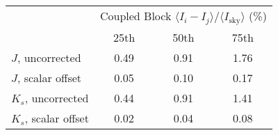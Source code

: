 \begin{tabular}{lccc}
& \multicolumn{3}{c}{Coupled Block
$\langle I_i - I_j\rangle / \langle I_\mathrm{sky} \rangle$ (\%)} \\
& 25th & 50th & 75th \\
\hline
$J$, uncorrected & 0.49 & 0.91 & 1.76 \\
$J$, scalar offset & 0.05 & 0.10 & 0.17 \\
\hline
$K_s$, uncorrected & 0.44 & 0.91 & 1.41 \\
$K_s$, scalar offset & 0.02 & 0.04 & 0.08 \\
\hline
\end{tabular}